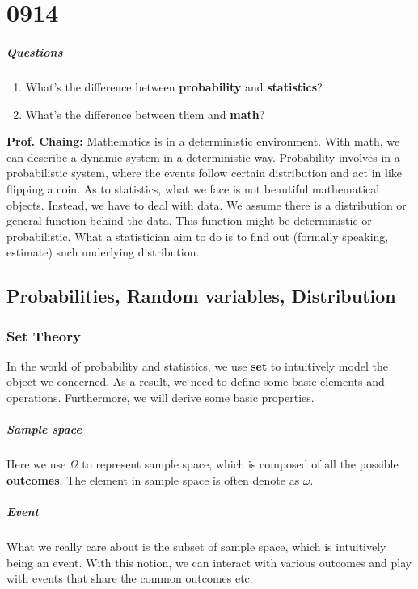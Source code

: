 \documentclass[11pt]{report}
\begin{document}
\tableofcontents

\chapter{0914}
\paragraph{Questions}
\begin{enumerate}
	\item What's the difference between {\bf probability} and {\bf statistics}?
	\item What's the difference between them and {\bf math}?
\end{enumerate}
{\bf Prof. Chaing:}
Mathematics is in a  {\color{red} deterministic}  environment. With math, we can describe a dynamic system in a deterministic way. Probability involves in a probabilistic system, where the events follow certain distribution and act in like flipping a coin. As to statistics, what we face is not beautiful mathematical objects. Instead, we have to deal with {\color{red} data}. We assume there is a distribution or general function behind the data. This function might be deterministic or probabilistic. What a statistician aim to do is to find out (formally speaking, estimate) such underlying distribution.

\section{Probabilities, Random variables, Distribution}
\subsection{Set Theory}
In the world of probability and statistics, we use {\bf set} to intuitively model the object we concerned. As a result, we need to define some basic elements and operations. Furthermore, we will derive some basic properties.
\paragraph{Sample space}
Here we use $\Omega$ to represent sample space, which is composed of all the possible {\bf outcomes}. The element in sample space is often denote as $\omega$.
\paragraph{Event}
What we really care about is the subset of sample space, which is intuitively being an event. With this notion, we can interact with various outcomes and play with events that share the common outcomes etc.
\end{document}
